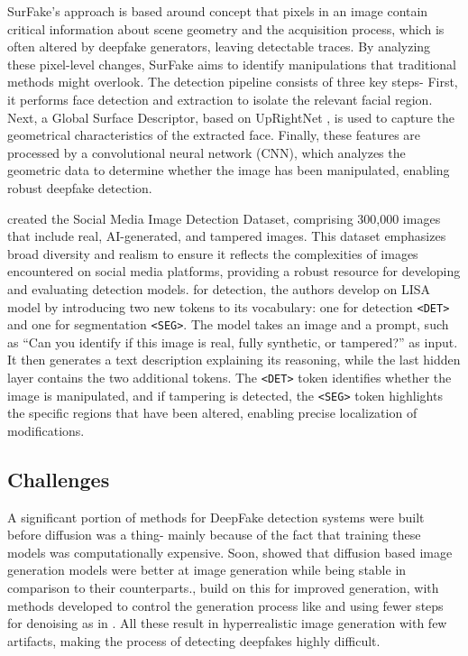 \documentclass[10pt,twocolumn,letterpaper]{article}
\begin{document}
SurFake's \cite{ciamarraDeepfakeDetectionExploiting2024} approach is based around concept that pixels in an image contain critical information about scene geometry and the acquisition process, which is often altered by deepfake generators, leaving detectable traces. By analyzing these pixel-level changes, SurFake aims to identify manipulations that traditional methods might overlook. The detection pipeline consists of three key steps- First, it performs face detection and extraction to isolate the relevant facial region. Next, a Global Surface Descriptor, based on UpRightNet \cite{xianUprightNetGeometryAwareCamera2019}, is used to capture the geometrical characteristics of the extracted face. Finally, these features are processed by a convolutional neural network (CNN), which analyzes the geometric data to determine whether the image has been manipulated, enabling robust deepfake detection.

\cite{huangSIDASocialMedia2025} created the Social Media Image Detection Dataset, comprising 300,000 images that include real, AI-generated, and tampered images. This dataset emphasizes broad diversity and realism to ensure it reflects the complexities of images encountered on social media platforms, providing a robust resource for developing and evaluating detection models. for detection, the authors develop on LISA \cite{laiLISAReasoningSegmentation2024} model by introducing two new tokens to its vocabulary: one for detection \texttt{<DET>} and one for segmentation \texttt{<SEG>}. The model takes an image and a prompt, such as “Can you identify if this image is real, fully synthetic, or tampered?” as input. It then generates a text description explaining its reasoning, while the last hidden layer contains the two additional tokens. The \texttt{<DET>} token identifies whether the image is manipulated, and if tampering is detected, the \texttt{<SEG>} token highlights the specific regions that have been altered, enabling precise localization of modifications.

\subsection{Challenges}
A significant portion of methods for DeepFake detection systems were built before diffusion \cite{hoDenoisingDiffusionProbabilistic2020} was a thing- mainly because of the fact that training these models was computationally expensive. Soon, \cite{dhariwalDiffusionModelsBeat2021} showed that diffusion based image generation models were better at image generation while being stable in comparison to their counterparts.\cite{rombachHighResolutionImageSynthesis2022}, \cite{lipmanFlowMatchingGenerative2023} build on this for improved generation, with methods developed to control the generation process like \cite{ruizDreamBoothFineTuning2023, zhangAddingConditionalControl2023} and using fewer steps for denoising as in \cite{lipmanFlowMatchingGenerative2023}. All these result in hyperrealistic image generation with few artifacts, making the process of detecting deepfakes highly difficult. 
\end{document}
